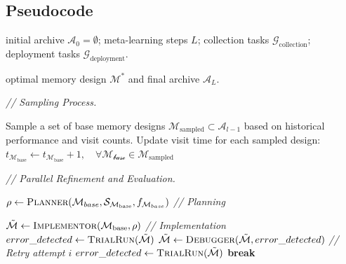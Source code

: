 \documentclass{article}
\theoremstyle{plain}
\theoremstyle{definition}
\theoremstyle{remark}
\begin{document}
\subsection{Pseudocode}
\label{Pseudocode}

\begin{algorithm}[H]
\caption{Learning of Memory Designs}
\label{alg:meta_learning}
\begin{algorithmic}[1]

initial archive $\mathcal{A}_0 = \emptyset$; 
meta-learning steps $L$; 
collection tasks $\mathcal{G}_{\text{collection}}$; 
deployment tasks $\mathcal{G}_{\text{deployment}}$.

optimal memory design $\mathcal{M}^*$ and final archive $\mathcal{A}_L$.


    \item[] \textit{// Sampling Process.}

    \STATE Sample a set of base memory designs
    $
    \mathcal{M}_{\text{sampled}} \subset \mathcal{A}_{l-1}
    $
    based on historical performance and visit counts.
    \STATE Update visit time for each sampled design:
    $
    t_{\mathcal{M}_{\text{base}}} \leftarrow t_{\mathcal{M}_{\text{base}}} + 1, \quad \forall \mathcal{M_{\text{base}}} \in \mathcal{M}_{\text{sampled}}
    $
    \item[] \textit{// Parallel Refinement and Evaluation.}

        \STATE $\rho \leftarrow \textsc{Planner}(\mathcal{M}_{base},\mathcal{S}_{\mathcal{M}_{\text{base}}}, f_{\mathcal{M}_{base}})$
        \hfill \textit{// Planning}

        \STATE
        $\tilde{\mathcal{M}} \leftarrow \textsc{Implementor}(\mathcal{M}_{\text{base}}, \rho)$
        \hfill \textit{// Implementation}
        \STATE $error\_detected \leftarrow \textsc{TrialRun}(\tilde{\mathcal{M}})$
                \STATE $\tilde{\mathcal{M}} \leftarrow \textsc{Debugger}(\tilde{\mathcal{M}}, error\_detected)$
                \hfill \textit{// Retry attempt $i$}
                \STATE $error\_detected \leftarrow \textsc{TrialRun}(\tilde{\mathcal{M}})$
                 \STATE \textbf{break} \ENDIF
            \ENDFOR
        \ENDIF
        

\end{algorithmic}
\end{algorithm}
\end{document}
